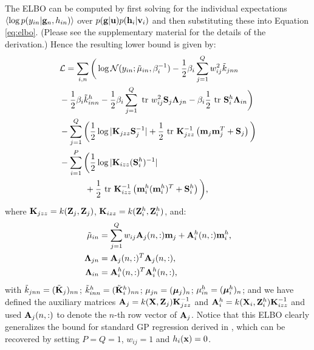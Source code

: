 The ELBO can be computed by first solving for the individual expectations 
$ \left\langle \log p(y_{in} | \mathbf{g}_n, h_{in})  \right\rangle$ over ${p(\mathbf{g} | \mathbf{u}) p(\mathbf{h}_i | \mathbf{v}_i)}$ and 
then substituting these into Equation \ref{eq:elbo}. (Please see 
the supplementary material for the details of the derivation.)  
Hence the resulting lower bound is given by:
\begin{align}
\nonumber
 & \mathcal{L} = 
\sum_{i,n}
\bigg( \log  \mathcal{N}(y_{in}; \tilde{\mu}_{in}, \beta_i^{-1})
          - \frac{1}{2} \beta_i \sum_{j=1}^Q w_{ij}^2 \tilde{k}_{jnn} \\ \nonumber
         &- \frac{1}{2} \beta_i \tilde{k}^h_{inn}
         - \frac{1}{2} \beta_i \sum_{j=1}^Q \mbox{ \rm tr } w_{ij}^2 \mathbf{S}_j \mathbf{\Lambda}_{jn} - \beta_i \frac{1}{2} \mbox{ \rm tr } \mathbf{S}^h_i \mathbf{\Lambda}_{in} 
\bigg) \\
\nonumber
& - \sum_{j=1}^Q \bigg( \frac{1}{2} \log |\mathbf{K}_{jzz} \mathbf{S}_j^{-1}| + \frac{1}{2} \mbox{ \rm tr } \mathbf{K}_{jzz}^{-1}  \left( \mathbf{m}_j \mathbf{m}_j^T + \mathbf{S}_j \right)\bigg) \\
\nonumber
& - \sum_{i=1}^P  \bigg( \frac{1}{2} \log |\mathbf{K}_{izz}(\mathbf{S}^h_i)^{-1}| \\
& \quad \qquad + \frac{1}{2} \mbox{ \rm tr } \mathbf{K}_{izz}^{-1} \left( \mathbf{m}^h_i (\mathbf{m}^h_i)^T   +   \mathbf{S}^h_i \right) \bigg)  \text{,}
  \label{eq:L}
\end{align}
%
where $\mathbf{K}_{jzz} = k(\mathbf{Z}_j, \mathbf{Z}_j)$, $\mathbf{K}_{izz} = k(\mathbf{Z}^h_i, \mathbf{Z}^h_i)$, and:
\begin{align}
\tilde{\mu}_{in}
&= \sum_{j=1}^Q w_{ij} \mathbf{A}_j(n,:) \mathbf{m}_j + \mathbf{A}^h_i(n,:) \mathbf{m}^h_i \text{,}\\
\mathbf{\Lambda}_{jn}
&= \mathbf{A}_j(n,:)^T \mathbf{A}_j(n,:)  \text{,}\\
\mathbf{\Lambda}_{in}
&= \mathbf{A}^h_i(n,:)^T \mathbf{A}^h_i(n,:)  \text{,}
\end{align}
with $\tilde{k}_{jnn} = (\tilde{\mathbf{K}}_j)_{nn}$; 
$\tilde{k}^h_{inn} = (\tilde{\mathbf{K}}^h_i)_{nn}$; 
$\mu_{jn} = (\boldsymbol{\mu}_j)_n$;
 $\mu^h_{in} = (\boldsymbol{\mu}^h_i)_n$; 
and we have defined the auxiliary matrices $\mathbf{A}_j = k(\mathbf{X},\mathbf{Z}_j) \mathbf{K}_{jzz}^{-1}$ and $\mathbf{A}^h_i = k(\mathbf{X}_i,\mathbf{Z}^h_i)\mathbf{K}_{izz}^{-1}$ and 
used $\mathbf{A}_j(n,:)$ to denote the $n$-th row vector of $\mathbf{A}_j$. 
Notice that this ELBO clearly generalizes the bound for standard GP regression derived in \cite{hensmangaussian}, which can be recovered by setting $P = Q = 1$, $w_{ij} = 1$ and $h_i(\mathbf{x}) = 0$.

